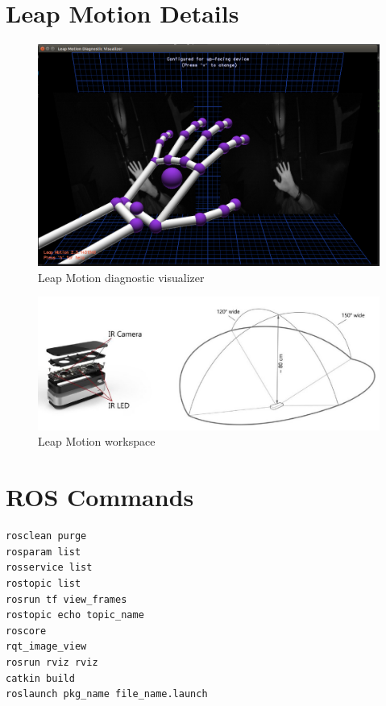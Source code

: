 \documentclass[headsepline,footinclude=false,fontsize=11pt,paper=a4,listof=totoc,bibliography=totoc,BCOR=12mm,DIV=14]{scrbook}
\begin{document}
\newpage
\section{Leap Motion Details}

\begin{figure}[h!]
    \centering
    \includegraphics[width=\textwidth]{figures/leap}
    \caption{Leap Motion diagnostic visualizer}
\end{figure}

\begin{figure}[h!]
    \centering
    \includegraphics[width=\textwidth]{images/leap}
    \caption{Leap Motion workspace \cite{Wozniak}}
\end{figure}

\newpage
\section{ROS Commands}
\begin{lstlisting}[language=bash, caption={Useful \gls{ros} commands}]
rosclean purge
rosparam list
rosservice list
rostopic list 
rosrun tf view_frames
rostopic echo topic_name
roscore
rqt_image_view
rosrun rviz rviz
catkin build
roslaunch pkg_name file_name.launch
\end{lstlisting}
\end{document}

